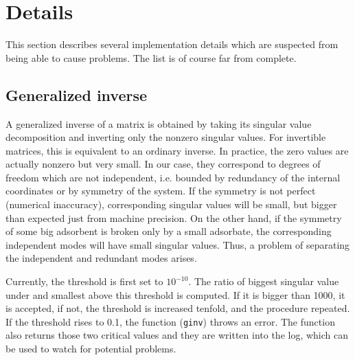 \documentclass[12pt,a4]{article}
\newcommand{\ttt}{\texttt}
\begin{document}
\section{Details}

This section describes several implementation details which are suspected from being able to cause problems. The list is of course far from complete.

\subsection{Generalized inverse}

A generalized inverse of a matrix is obtained by taking its singular value decomposition and inverting only the nonzero singular values. For invertible matrices, this is equivalent to an ordinary inverse. In practice, the zero values are actually nonzero but very small. In our case, they correspond to degrees of freedom which are not independent, i.e. bounded by redundancy of the internal coordinates or by symmetry of the system. If the symmetry is not perfect (numerical inaccuracy), corresponding singular values will be small, but bigger than expected just from machine precision. On the other hand, if the symmetry of some big adsorbent is broken only by a small adsorbate, the corresponding independent modes will have small singular values. Thus, a problem of separating the independent and redundant modes arises.

Currently, the threshold is first set to $10^{-10}$. The ratio of biggest singular value under and smallest above this threshold is computed. If it is bigger than 1000, it is accepted, if not, the threshold is increased tenfold, and the procedure repeated. If the threshold rises to 0.1, the function (\ttt{ginv}) throws an error. The function also returns those two critical values and they are written into the log, which can be used to watch for potential problems.
	
\end{document}
